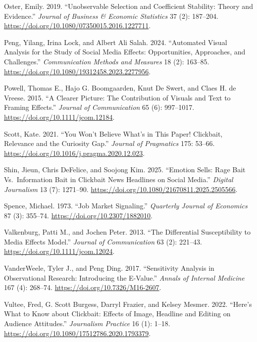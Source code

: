 \documentclass[
  12pt,
]{article}
\newlength{\cslhangindent}
\newenvironment{CSLReferences}[2] %
 {\begin{list}{}{%
  \setlength{\itemindent}{0pt}
  \setlength{\leftmargin}{0pt}
  \setlength{\parsep}{0pt}
  \ifodd #1
   \setlength{\leftmargin}{\cslhangindent}
   \setlength{\itemindent}{-1\cslhangindent}
  \fi
  \setlength{\itemsep}{#2\baselineskip}}}
 {\end{list}}
\begin{document}
\begin{CSLReferences}{1}{0}
Oster, Emily. 2019. {``Unobservable Selection and Coefficient Stability:
Theory and Evidence.''} \emph{Journal of Business \& Economic
Statistics} 37 (2): 187--204.
\url{https://doi.org/10.1080/07350015.2016.1227711}.

Peng, Yilang, Irina Lock, and Albert Ali Salah. 2024. {``Automated
Visual Analysis for the Study of Social Media Effects: Opportunities,
Approaches, and Challenges.''} \emph{Communication Methods and Measures}
18 (2): 163--85. \url{https://doi.org/10.1080/19312458.2023.2277956}.

Powell, Thomas E., Hajo G. Boomgaarden, Knut De Swert, and Claes H. de
Vreese. 2015. {``A Clearer Picture: The Contribution of Visuals and Text
to Framing Effects.''} \emph{Journal of Communication} 65 (6):
997--1017. \url{https://doi.org/10.1111/jcom.12184}.

Scott, Kate. 2021. {``You Won't Believe What's in This Paper!
{C}lickbait, Relevance and the Curiosity Gap.''} \emph{Journal of
Pragmatics} 175: 53--66.
\url{https://doi.org/10.1016/j.pragma.2020.12.023}.

Shin, Jieun, Chris DeFelice, and Soojong Kim. 2025. {``Emotion Sells:
Rage Bait Vs.~Information Bait in Clickbait News Headlines on Social
Media.''} \emph{Digital Journalism} 13 (7): 1271--90.
\url{https://doi.org/10.1080/21670811.2025.2505566}.

Spence, Michael. 1973. {``Job Market Signaling.''} \emph{Quarterly
Journal of Economics} 87 (3): 355--74.
\url{https://doi.org/10.2307/1882010}.

Valkenburg, Patti M., and Jochen Peter. 2013. {``The Differential
Susceptibility to Media Effects Model.''} \emph{Journal of
Communication} 63 (2): 221--43.
\url{https://doi.org/10.1111/jcom.12024}.

VanderWeele, Tyler J., and Peng Ding. 2017. {``Sensitivity Analysis in
Observational Research: Introducing the {E}-Value.''} \emph{Annals of
Internal Medicine} 167 (4): 268--74.
\url{https://doi.org/10.7326/M16-2607}.

Vultee, Fred, G. Scott Burgess, Darryl Frazier, and Kelsey Mesmer. 2022.
{``Here's What to Know about Clickbait: Effects of Image, Headline and
Editing on Audience Attitudes.''} \emph{Journalism Practice} 16 (1):
1--18. \url{https://doi.org/10.1080/17512786.2020.1793379}.


\end{CSLReferences}
\end{document}
